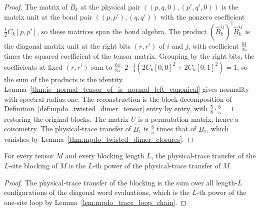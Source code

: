 \begin{proof}\leanok
    The matrix of $B_k$ at the physical pair $((p,q,0),(p',q',0))$ is the
    matrix unit at the bond pair $((p,p'),(q,q'))$ with the nonzero
    coefficient $\frac12 C_k[p,p']$, so these matrices span the bond algebra.
    The product $(\widehat B_k^{ij})^\dagger\widehat B_k^{ij}$ is the
    diagonal matrix unit at the right bits $(r,r')$ of $i$ and $j$, with
    coefficient $\frac{64}{25}$ times the squared coefficient of the tensor
    matrix. Grouping by the right bits, the coefficients at fixed
    $(r,r')$ sum to
    $\frac{64}{25}\cdot2\cdot\frac14(2C_k[0,0]^2+2C_k[0,1]^2)=1$,
    so the sum of the products is the identity.
    Lemma~\ref{thm:is_normal_tensor_of_is_normal_left_canonical} gives
    normality with spectral radius one. The reconstruction is the block
    decomposition of Definition~\ref{def:mpdo_twisted_dimer_tensor} entry by
    entry, with $\frac58\cdot\frac85=1$ restoring the original blocks.
    The matrix $U$ is a permutation matrix, hence a coisometry.
    The physical-trace transfer of $\widehat B_1$ is $\frac85$ times that of
    $B_1$, which vanishes by
    Lemma~\ref{thm:mpdo_twisted_dimer_closures}.
\end{proof}

\begin{lemma}%
    \label{lem:mpdo_phys_trace_transfer_blocking}
    \leanok
    For every tensor $M$ and every blocking length $L$, the physical-trace
    transfer of the $L$-site blocking of $M$ is the $L$-th power of the
    physical-trace transfer of $M$.
\end{lemma}
\begin{proof}\leanok
    The physical-trace transfer of the blocking is the sum over all
    length-$L$ configurations of the diagonal word evaluations, which is the
    $L$-th power of the one-site loop by
    Lemma~\ref{lem:mpdo_trace_loop_chain}.
\end{proof}

